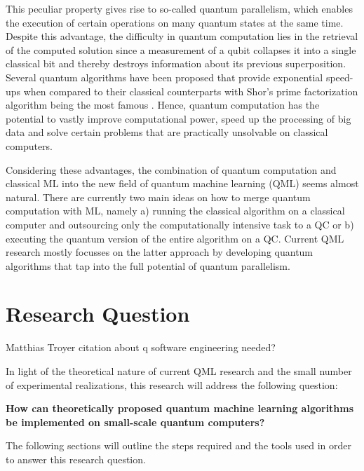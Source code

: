 This peculiar property gives rise to so-called quantum parallelism, which enables the execution of certain operations on many quantum states at the same time. Despite this advantage, the difficulty in quantum computation lies in the retrieval of the computed solution since a measurement of a qubit collapses it into a single classical bit and thereby destroys information about its previous superposition. Several quantum algorithms have been proposed that provide exponential speed-ups when compared to their classical counterparts with Shor's prime factorization algorithm being the most famous \cite{shor1994}.
Hence, quantum computation has the potential to vastly improve computational power, speed up the processing of big data and solve certain problems that are practically unsolvable on classical computers. 


Considering these advantages, the combination of quantum computation and classical ML into the new field of quantum machine learning (QML) seems almost natural. There are currently two main ideas on how to merge quantum computation with ML, namely a) running the classical algorithm on a classical computer and outsourcing only the computationally intensive task to a QC or b) executing the quantum version of the entire algorithm on a QC. Current QML research mostly focusses on the latter approach by developing quantum algorithms that tap into the full potential of quantum parallelism.


\section{Research Question}
\label{subsec:researchquestion}

Matthias Troyer citation about q software engineering needed?

In light of the theoretical nature of current QML research and the small number of experimental realizations, this research will address the following question:

\centering\textbf{How can theoretically proposed quantum machine learning algorithms be implemented on small-scale quantum computers?}


\justify
The following sections will outline the steps required and the tools used in order to answer this research question. 
